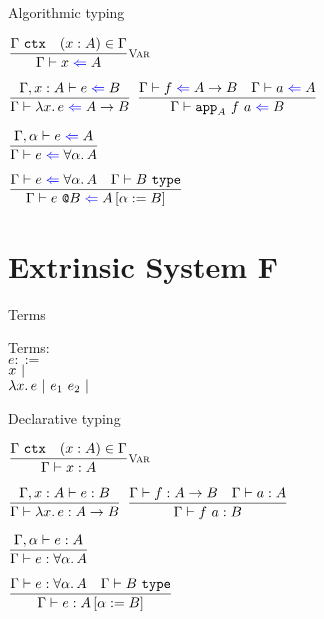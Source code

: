 \documentclass{beamer}
\begin{document}
\begin{frame}{Algorithmic typing}

\begin{center}
  $\infrule[Var]{\ctx{\Gamma} \quad \sidecond{(x : A) \in \Gamma}}{\check{x}{A}}$

  \vspace{2em}

  $\infrule{\check[\extend{\Gamma}{x}{A}]{e}{B}}{\check{\fun{x}{e}}{\Fun{A}{B}}}$ \quad
  $\infrule{\check{f}{\Fun{A}{B}} \quad \check{a}{A}}{\check{\app[A]{f}{a}}{B}}$

  \vspace{2em}

  $\infrule{\check[\extendtype{\Gamma}{\alpha}]{e}{A}}{\check{e}{\ForallT{\alpha}{A}}}$

  \vspace{2em}

  $\infrule{\check{e}{\ForallT{\alpha}{A}} \quad \type{B}}{\check{\tapp{e}{B}}{\subst{A}{\alpha}{B}}}$
\end{center}

\end{frame}

\section{Extrinsic System F}

\begin{frame}{Terms}

Terms: \\
$e ::=$ \\
\qquad $x \ |\  $ \\
\qquad $\fun{x}{e} \pipe \app{e_1}{e_2} \pipe$

\end{frame}

\begin{frame}{Declarative typing}

\begin{center}
  $\infrule[Var]{\ctx{\Gamma} \quad \sidecond{(x : A) \in \Gamma}}{\typing{x}{A}}$

  \vspace{2em}

  $\infrule{\typing[\extend{\Gamma}{x}{A}]{e}{B}}{\typing{\fun{x}{e}}{\Fun{A}{B}}}$ \quad
  $\infrule{\typing{f}{\Fun{A}{B}} \quad \typing{a}{A}}{\typing{\app{f}{a}}{B}}$

  \vspace{2em}

  $\infrule{\typing[\extendtype{\Gamma}{\alpha}]{e}{A}}{\typing{e}{\ForallT{\alpha}{A}}}$

  \vspace{2em}

  $\infrule{\typing{e}{\ForallT{\alpha}{A}} \quad \type{B}}{\typing{e}{\subst{A}{\alpha}{B}}}$
\end{center}

\end{frame}
\end{document}
